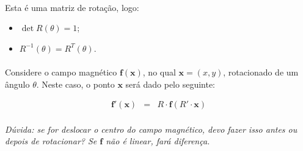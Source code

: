 \documentclass[introducao.tex]{subfiles}
\begin{document}
\paragraph{} Esta é uma matriz de rotação, logo:
\begin{itemize}
	\item $\det R(\theta) = 1$;
	\item $R^{-1}(\theta) = R^T(\theta)$.
\end{itemize}

\paragraph{} Considere o campo magnético $\mathbf{f}(\mathbf{x})$, no qual $\mathbf{x} = (x,y)$, rotacionado de um ângulo $\theta$. Neste caso, o ponto $\mathbf{x}$ será dado pelo seguinte:

\begin{eqnarray}
\mathbf{f}'(\mathbf{x}) & = & R\cdot \mathbf{f}(R'\cdot \mathbf{x})
\end{eqnarray}

\paragraph{} \textit{Dúvida: se for deslocar o centro do campo magnético, devo fazer isso antes ou depois de rotacionar? Se $\mathbf{f}$ não é linear, fará diferença.}
\end{document}
